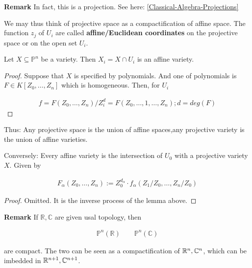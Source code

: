 \documentclass[Total.tex]{subfiles}
\begin{document}
			\textbf{Remark} In fact, this is a projection. See here: \ref{Classical-Algebra-Projections}
			
			\begin{Def}
				We may thus think of projective space as a compactification of affine space. The function $z_j$ of $U_i$ are called \textbf{affine/Euclidean coordinates} on the projective space or on the open set $U_i$. 
			\end{Def}
			
			\begin{lemma}
				Let $X\subseteq \mathbb{P}^n$ be a variety. Then $X_i=X\cap U_i$ is an affine variety. 
			\end{lemma}
			
			\begin{proof}
				Suppose that $X$ is specified by polynomials. And one of polynomials is $F\in K[Z_0,\dots,Z_n]$ which is homogeneous. Then, for $U_i$
				
				\begin{gather*}
					f=F(Z_0,\dots,Z_n)/Z_i^d=F(Z_0,\dots,1,\dots,Z_n);d=deg(F)
				\end{gather*} 
				
				
			\end{proof}
			
			Thus: Any projective space is the union of affine spaces,any projective variety is the union of affine varieties.
			
			\begin{lemma}
				Conversely: Every affine variety is the intersection of $U_0$ with a projective variety $X$. Given by
				
				\begin{gather*}
					F_\alpha(Z_0,\dots,Z_n):=Z_0^{d_\alpha}\cdot f_\alpha(Z_1/Z_0,\dots,Z_n/Z_0)
				\end{gather*}
			\end{lemma}
			
			\begin{proof}
				Omitted. It is the inverse process of the lemma above.
			\end{proof}
			
			\textbf{Remark} If $\mathbb{R},\mathbb{C}$ are given usal topology, then 
			
			\begin{gather*}
				\mathbb{P}^n(\mathbb{R})\qquad \mathbb{P}^n(\mathbb{C})
			\end{gather*}
			
			are compact. The two can be seen as a compactification of $\mathbb{R}^n,\mathbb{C}^n$, which can be imbedded in $\mathbb{R}^{n+1},\mathbb{C}^{n+1}$.
			
\end{document}
